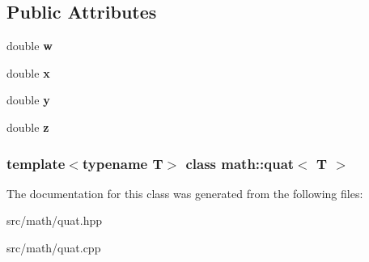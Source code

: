 \subsection*{Public Attributes}
\begin{DoxyCompactItemize}
\item 
\hypertarget{classmath_1_1quat_ac697346ca2f6990c351bec68311230e2}{
double {\bfseries w}}
\label{classmath_1_1quat_ac697346ca2f6990c351bec68311230e2}

\item 
\hypertarget{classmath_1_1quat_afb5b48747708a7d84fcf70f839921111}{
double {\bfseries x}}
\label{classmath_1_1quat_afb5b48747708a7d84fcf70f839921111}

\item 
\hypertarget{classmath_1_1quat_a7fa879fe9d7900cd1e0f16c985b20c6e}{
double {\bfseries y}}
\label{classmath_1_1quat_a7fa879fe9d7900cd1e0f16c985b20c6e}

\item 
\hypertarget{classmath_1_1quat_a80d9762c9a32939a1196086cccae7400}{
double {\bfseries z}}
\label{classmath_1_1quat_a80d9762c9a32939a1196086cccae7400}

\end{DoxyCompactItemize}
\subsubsection*{template$<$typename T$>$ class math::quat$<$ T $>$}



The documentation for this class was generated from the following files:\begin{DoxyCompactItemize}
\item 
src/math/quat.hpp\item 
src/math/quat.cpp\end{DoxyCompactItemize}
